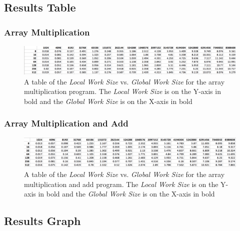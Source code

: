 \documentclass[onecolumn,draftclsnofoot, 10pt, compsoc]{IEEEtran}
\begin{document}
	
	\subsection{Results Table}
		\subsubsection{Array Multiplication}
			\begin{figure}[H]
				\includegraphics[width=18cm]{multTable}
				\centering
				\caption{A table of the \textit{Local Work Size} vs. \textit{Global Work Size} for the array multiplication program.
					The \textit{Local Work Size} is on the Y-axis in bold and the \textit{Global Work Size} is on the X-axis in bold}
			\end{figure}
	
		\subsubsection{Array Multiplication and Add}
			\begin{figure}[H]
				\includegraphics[width=18cm]{multAddTable}
				\centering
				\caption{A table of the \textit{Local Work Size} vs. \textit{Global Work Size} for the array multiplication and add program.
				 The \textit{Local Work Size} is on the Y-axis in bold and the \textit{Global Work Size} is on the X-axis in bold}
			\end{figure}
		
		
		
		
		
	\subsection{Results Graph}
\end{document}
